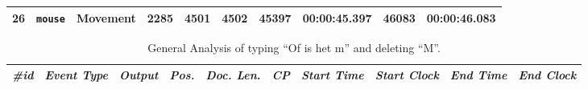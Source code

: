 \begin{paper}
\begin{table}[H]
\begin{tabular}{p{}p{}|p{}|p{}p{}p{}p{}p{}p{}p{}}
26	& \verb|mouse|	& Movement	& 2285	& 4501	& 4502	& 45397	& 00:00:45.397	& 46083	& 00:00:46.083\tabularnewline
\bottomrule
\end{tabular}
\end{table}
\renewcommand*{\thefootnote}{\fnsymbol{footnote}}
\begin{table}[H]
\centering\tiny\renewcommand{\arraystretch}{1.5}
\caption[General Analysis of typing ``Of is het m'' and deleting ``M''.]{General Analysis of typing ``Of is het m'' and deleting ``M''.\footnotemark[2]}
\label{tab:bekius:replacement2}
\begin{tabular}{p{}p{}|p{}|p{}p{}p{}p{}p{}p{}p{}}
\toprule
\textit{\#id} & \textit{Event Type} & \textit{Output} & \textit{Pos.} & \textit{Doc. Len}. & \textit{CP} & \textit{Start Time} & \textit{Start Clock} & \textit{End Time }& \textit{End Clock}\tabularnewline
\midrule


\end{tabular}
\end{table}
\end{paper}
